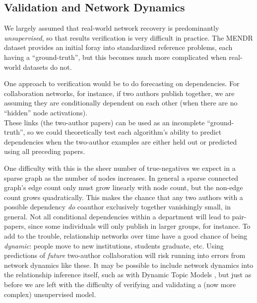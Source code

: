 \documentclass[%
	12pt,
		oneside,
		letterpaper
]{book}
\begin{document}
\subsection{Validation and Network Dynamics}\label{validation-and-network-dynamics}

We largely assumed that real-world network recovery is predominantly \emph{unsupervised}, so that results verification is very difficult in practice.
The MENDR dataset provides an initial foray into standardized reference problems, each having a ``ground-truth'', but this becomes much more complicated when real-world datasets do not.

One approach to verification would be to do forecasting on dependencies.
For collaboration networks, for instance, if two authors publish together, we are assuming they are conditionally dependent on each other (when there are no ``hidden'' node activations).\\
These links (the two-author papers) can be used as an incomplete ``ground-truth'', so we could theoretically test each algorithm's ability to predict dependencies when the two-author examples are either held out or predicted using all preceding papers.

One difficulty with this is the sheer number of true-negatives we expect in a sparse graph as the number of nodes increases.
In general a sparse connected graph's edge count only must grow linearly with node count, but the non-edge count grows quadratically.
This makes the chance that any two authors with a possible dependency \emph{do} coauthor exclusively together vanishingly small, in general.
Not all conditional dependencies within a department will lead to pair-papers, since some individuals will only publish in larger groups, for instance.
To add to the trouble, relationship networks over time have a good chance of being \emph{dynamic}: people move to new institutions, students graduate, etc.
Using predictions of \emph{future} two-author collaboration will risk running into errors from network dynamics like these.
It may be possible to include network dynamics into the relationship inference itself, such as with Dynamic Topic Models \autocite{Dynamictopicmodels_Blei2006}, but just as before we are left with the difficulty of verifying and validating a (now more complex) unsupervised model.
\end{document}
